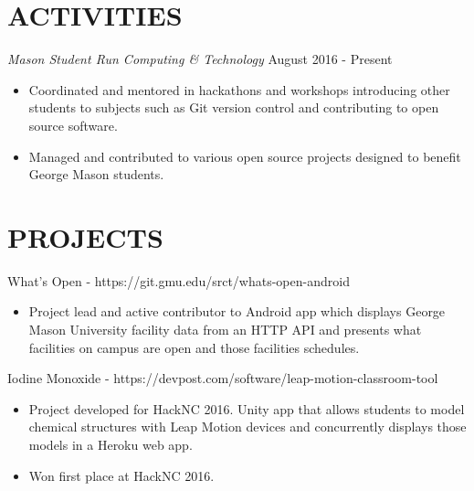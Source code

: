 \documentclass[margin, 10pt]{res} %
\begin{document}
\begin{resume}
\section{ACTIVITIES}

{\sl Mason Student Run Computing \& Technology} \hfill August 2016 - Present
\begin{itemize}
\item Coordinated and mentored in hackathons and workshops introducing other students to subjects such as Git version control and contributing to open source software.
\item Managed and contributed to various open source projects designed to benefit George Mason students.
\end{itemize} 




\section{PROJECTS} 

What's Open - https://git.gmu.edu/srct/whats-open-android
\begin{itemize}
\item Project lead and active contributor to Android app which displays George Mason University facility data from an HTTP API and presents what facilities on campus are open and those facilities schedules.
\end{itemize}

Iodine Monoxide - https://devpost.com/software/leap-motion-classroom-tool
\begin{itemize}
\item Project developed for HackNC 2016. Unity app that allows students to model chemical structures with Leap Motion devices and concurrently displays those models in a Heroku web app.
\item Won first place at HackNC 2016.
\end{itemize}


\end{resume}
\end{document}
